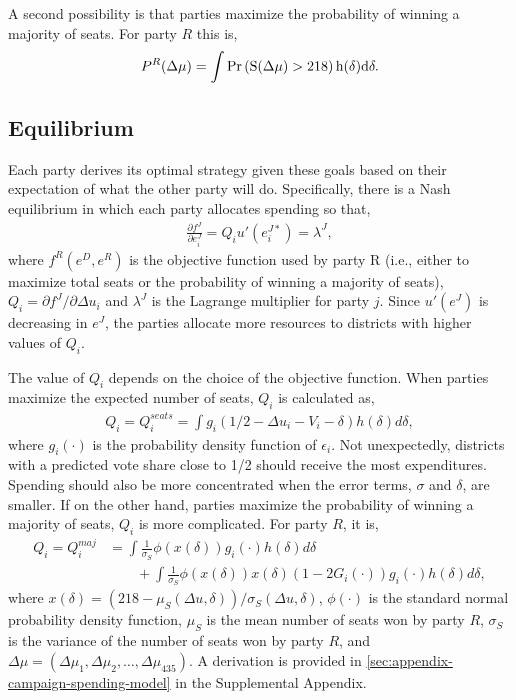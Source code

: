 \documentclass[12pt,final,fleqn]{article}
\theoremstyle{plain}
\begin{document}
A second possibility is that parties maximize the probability of winning a majority of seats. For party $R$ this is,
\begin{align}
P^R(\Delta \mu) = \int \rm{Pr}\left(S(\Delta \mu) > 218 \right) h(\delta)d \delta.
\end{align}

\subsection{Equilibrium} \label{sec:equilibrium}
Each party derives its optimal strategy given these goals based on their expectation of what the other party will do. Specifically, there is a Nash equilibrium in which each party allocates spending so that,
\begin{align}
\frac{\partial f^J}{\partial e_i^J}= Q_i u'(e^{J*}_i)=\lambda^J,
\end{align}
where $f^R(e^D, e^R)$ is the objective function used by party R (i.e., either to maximize total seats or the probability of winning a majority of seats), $Q_i = \partial f^J/ \partial \Delta u_i$ and $\lambda^J$ is the Lagrange multiplier for party $j$. Since $u'(e^J)$ is decreasing in $e^J$, the parties allocate more resources to districts with higher values of $Q_i$. 

The value of $Q_i$ depends on the choice of the objective function. When parties maximize the expected number of seats, $Q_i$ is calculated as, 
\begin{align} \label{eqn: Q_i expected seats}
Q_i = Q_i^{seats} = \int  g_i(1/2 - \Delta u_i - V_i - \delta) h(\delta) d\delta,
\end{align}
where $g_i(\cdot)$ is the probability density function of $\epsilon_i$. Not unexpectedly, districts with a predicted vote share close to 1/2 should receive the most expenditures. Spending should also be more concentrated when the error terms, $\sigma$ and $\delta$, are smaller. If on the other hand, parties maximize the probability of winning a majority of seats, $Q_i$ is more complicated. For party $R$, it is,
\begin{align} \label{eqn: Q_i probability of winning}
Q_i  = Q_i^{maj}
& = \int \frac{1}{\sigma_S}\phi(x(\delta))g_i(\cdot)h(\delta)d\delta \nonumber \\
 &\qquad + \int \frac{1}{\sigma_S}\phi(x(\delta))x(\delta)\left(1-2G_i(\cdot)\right) g_i(\cdot)h(\delta)d\delta,
\end{align}
where $x(\delta) = \left(218 - \mu_S(\Delta u,\delta)\right)/\sigma_S(\Delta u, \delta)$, $\phi(\cdot)$ is the standard normal probability density function, $\mu_S$ is the mean number of seats won by party $R$, $\sigma_S$ is the variance of the number of seats won by party $R$, and $\Delta \mu = \left(\Delta \mu_1, \Delta \mu_2, \ldots, \Delta \mu_{435} \right)$. A derivation is provided in \autoref*{sec:appendix-campaign-spending-model} in the Supplemental Appendix.
\end{document}
